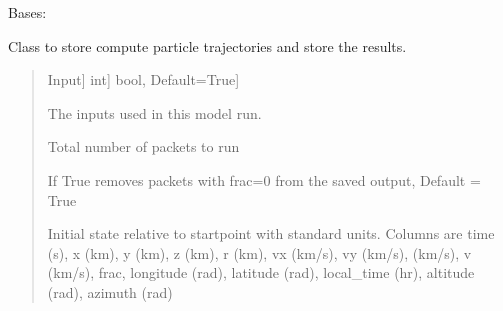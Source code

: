 \documentclass[letterpaper,10pt,english]{sphinxmanual}
\begin{document}
\begin{fulllineitems}
\label{\detokenize{nexoclom2/nexoclom2.particle_tracking.Output:nexoclom2.particle_tracking.Output.Output}}
\pysigstartsignatures
\pysiglinewithargsret
{}
{\sphinxparamcomma {}\sphinxparamcomma {}\sphinxparamcomma {}\sphinxparamcomma {}}
{}
\pysigstopsignatures
\sphinxAtStartPar
Bases: 

\sphinxAtStartPar
Class to store compute particle trajectories and store the results.
\begin{quote}\begin{description}
\begin{description}
\sphinxlineitem{\sphinxstylestrong{inputs}}{[}Input{]}
\sphinxlineitem{\sphinxstylestrong{n\_packets}}{[}int{]}
\sphinxlineitem{\sphinxstylestrong{compress}}{[}bool, Default=True{]}
\end{description}

\begin{description}
\sphinxAtStartPar
The inputs used in this model run.

\sphinxAtStartPar
Total number of packets to run

\sphinxAtStartPar
If True removes packets with frac=0 from the saved output, Default = True

\sphinxAtStartPar
Initial state relative to startpoint with standard units. Columns are
time (s), x (km), y (km), z (km), r (km), vx (km/s), vy (km/s),
(km/s), v (km/s), frac, longitude (rad), latitude (rad),
local\_time (hr), altitude (rad), azimuth (rad)

\end{description}

\end{description}\end{quote}


\end{fulllineitems}
\end{document}
